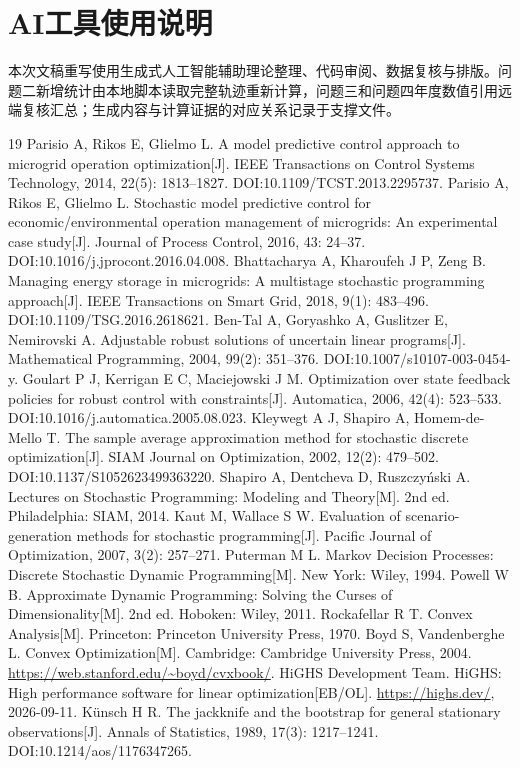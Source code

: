 \documentclass[UTF8,a4paper,zihao=-4,fontset=mac]{ctexart}
\begin{document}
\section*{AI工具使用说明}
本次文稿重写使用生成式人工智能辅助理论整理、代码审阅、数据复核与排版。问题二新增统计由本地脚本读取完整轨迹重新计算，问题三和问题四年度数值引用远端复核汇总；生成内容与计算证据的对应关系记录于支撑文件。
{\footnotesize
\begin{thebibliography}{19}
\setlength{\itemsep}{0.2em}
 Parisio A, Rikos E, Glielmo L. A model predictive control approach to microgrid operation optimization[J]. IEEE Transactions on Control Systems Technology, 2014, 22(5): 1813--1827. DOI:10.1109/TCST.2013.2295737.
 Parisio A, Rikos E, Glielmo L. Stochastic model predictive control for economic/environmental operation management of microgrids: An experimental case study[J]. Journal of Process Control, 2016, 43: 24--37. DOI:10.1016/j.jprocont.2016.04.008.
 Bhattacharya A, Kharoufeh J P, Zeng B. Managing energy storage in microgrids: A multistage stochastic programming approach[J]. IEEE Transactions on Smart Grid, 2018, 9(1): 483--496. DOI:10.1109/TSG.2016.2618621.
 Ben-Tal A, Goryashko A, Guslitzer E, Nemirovski A. Adjustable robust solutions of uncertain linear programs[J]. Mathematical Programming, 2004, 99(2): 351--376. DOI:10.1007/s10107-003-0454-y.
 Goulart P J, Kerrigan E C, Maciejowski J M. Optimization over state feedback policies for robust control with constraints[J]. Automatica, 2006, 42(4): 523--533. DOI:10.1016/j.automatica.2005.08.023.
 Kleywegt A J, Shapiro A, Homem-de-Mello T. The sample average approximation method for stochastic discrete optimization[J]. SIAM Journal on Optimization, 2002, 12(2): 479--502. DOI:10.1137/S1052623499363220.
 Shapiro A, Dentcheva D, Ruszczyński A. Lectures on Stochastic Programming: Modeling and Theory[M]. 2nd ed. Philadelphia: SIAM, 2014.
 Kaut M, Wallace S W. Evaluation of scenario-generation methods for stochastic programming[J]. Pacific Journal of Optimization, 2007, 3(2): 257--271.
 Puterman M L. Markov Decision Processes: Discrete Stochastic Dynamic Programming[M]. New York: Wiley, 1994.
 Powell W B. Approximate Dynamic Programming: Solving the Curses of Dimensionality[M]. 2nd ed. Hoboken: Wiley, 2011.
 Rockafellar R T. Convex Analysis[M]. Princeton: Princeton University Press, 1970.
 Boyd S, Vandenberghe L. Convex Optimization[M]. Cambridge: Cambridge University Press, 2004. \url{https://web.stanford.edu/~boyd/cvxbook/}.
 HiGHS Development Team. HiGHS: High performance software for linear optimization[EB/OL]. \url{https://highs.dev/}, 2026-09-11.
 Künsch H R. The jackknife and the bootstrap for general stationary observations[J]. Annals of Statistics, 1989, 17(3): 1217--1241. DOI:10.1214/aos/1176347265.
\end{thebibliography}
}
\label{bodyend}\clearpage\appendix
\end{document}
